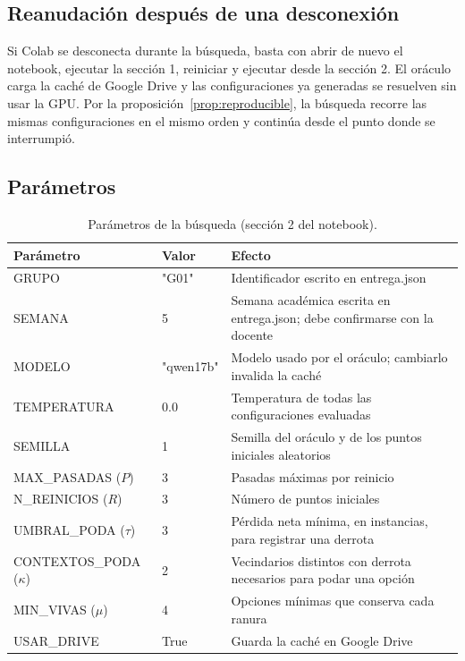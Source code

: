 \documentclass[12pt,letterpaper]{article}
\theoremstyle{definition}
\begin{document}
\subsection{Reanudación después de una desconexión}\label{sec:reanudacion}
Si Colab se desconecta durante la búsqueda, basta con abrir de nuevo el notebook, ejecutar la sección 1, reiniciar y ejecutar desde la sección 2. El oráculo carga la caché de Google Drive y las configuraciones ya generadas se resuelven sin usar la GPU. Por la proposición~\ref{prop:reproducible}, la búsqueda recorre las mismas configuraciones en el mismo orden y continúa desde el punto donde se interrumpió.

\subsection{Parámetros}

\begin{table}[H]
\caption{Parámetros de la búsqueda (sección 2 del notebook).}
\begin{tabularx}{\textwidth}{@{}p{4.2cm}p{2.2cm}L@{}}
\toprule
Parámetro & Valor & Efecto \\
\midrule
GRUPO & "G01" & Identificador escrito en entrega.json \\
SEMANA & 5 & Semana académica escrita en entrega.json; debe confirmarse con la docente \\
MODELO & "qwen17b" & Modelo usado por el oráculo; cambiarlo invalida la caché \\
TEMPERATURA & 0.0 & Temperatura de todas las configuraciones evaluadas \\
SEMILLA & 1 & Semilla del oráculo y de los puntos iniciales aleatorios \\
MAX\_PASADAS ($P$) & 3 & Pasadas máximas por reinicio \\
N\_REINICIOS ($R$) & 3 & Número de puntos iniciales \\
UMBRAL\_PODA ($\tau$) & 3 & Pérdida neta mínima, en instancias, para registrar una derrota \\
CONTEXTOS\_PODA ($\kappa$) & 2 & Vecindarios distintos con derrota necesarios para podar una opción \\
MIN\_VIVAS ($\mu$) & 4 & Opciones mínimas que conserva cada ranura \\
USAR\_DRIVE & True & Guarda la caché en Google Drive \\
\bottomrule
\end{tabularx}
\end{table}
\end{document}

